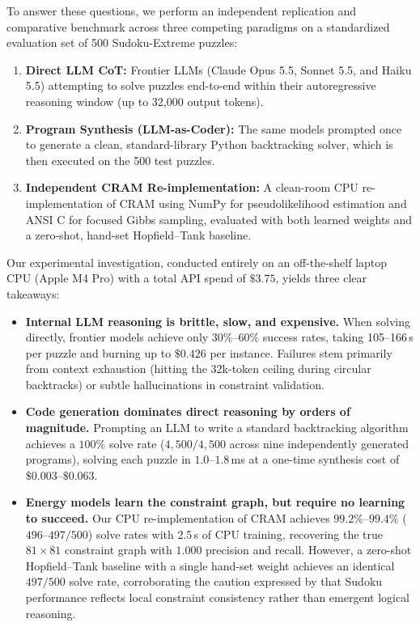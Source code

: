 \documentclass{article} %
\begin{document}
To answer these questions, we perform an independent replication and comparative benchmark across three competing paradigms on a standardized evaluation set of 500 Sudoku-Extreme puzzles:
\begin{enumerate}
    \item \textbf{Direct LLM CoT:} Frontier LLMs (Claude Opus 5.5, Sonnet 5.5, and Haiku 5.5) attempting to solve puzzles end-to-end within their autoregressive reasoning window (up to 32,000 output tokens).
    \item \textbf{Program Synthesis (LLM-as-Coder):} The same models prompted once to generate a clean, standard-library Python backtracking solver, which is then executed on the 500 test puzzles.
    \item \textbf{Independent CRAM Re-implementation:} A clean-room CPU re-implementation of CRAM using NumPy for pseudolikelihood estimation and ANSI C for focused Gibbs sampling, evaluated with both learned weights and a zero-shot, hand-set Hopfield--Tank baseline.
\end{enumerate}

Our experimental investigation, conducted entirely on an off-the-shelf laptop CPU (Apple M4 Pro) with a total API spend of $\$3.75$, yields three clear takeaways:
\begin{itemize}
    \item \textbf{Internal LLM reasoning is brittle, slow, and expensive.} When solving directly, frontier models achieve only $30\%$--$60\%$ success rates, taking 105--166\,s per puzzle and burning up to $\$0.426$ per instance. Failures stem primarily from context exhaustion (hitting the 32k-token ceiling during circular backtracks) or subtle hallucinations in constraint validation.
    \item \textbf{Code generation dominates direct reasoning by orders of magnitude.} Prompting an LLM to write a standard backtracking algorithm achieves a $100\%$ solve rate ($4,500/4,500$ across nine independently generated programs), solving each puzzle in $1.0$--$1.8$\,ms at a one-time synthesis cost of $\$0.003$--$\$0.063$.
    \item \textbf{Energy models learn the constraint graph, but require no learning to succeed.} Our CPU re-implementation of CRAM achieves $99.2\%$--$99.4\%$ ($496$--$497/500$) solve rates with 2.5\,s of CPU training, recovering the true $81 \times 81$ constraint graph with $1.000$ precision and recall. However, a zero-shot Hopfield--Tank baseline with a single hand-set weight achieves an identical $497/500$ solve rate, corroborating the caution expressed by \citet{hoover2026classical} that Sudoku performance reflects local constraint consistency rather than emergent logical reasoning.
\end{itemize}
\end{document}
